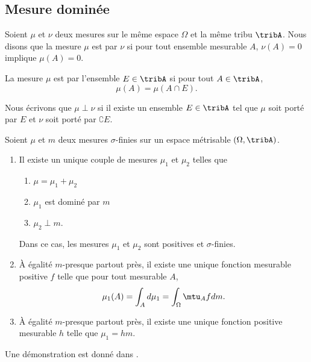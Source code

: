 \subsection{Mesure dominée}

Soient \( \mu\) et \( \nu\) deux mesures sur le même espace \( \Omega\) et la même tribu \( \tribA\). Nous disons que la mesure \( \mu\) est \cite{PersoFeng} par \( \nu\) si pour tout ensemble mesurable \( A\), \( \nu(A)=0\) implique \( \mu(A)=0\).

La mesure \( \mu\) est  par l'ensemble \( E\in\tribA\) si pour tout \( A\in\tribA\), 
\begin{equation}
    \mu(A)=\mu(A\cap E).
\end{equation}

Nous écrivons que \( \mu\perp\nu\) si il existe un ensemble \( E\in\tribA\) tel que \( \mu\) soit porté par \( E\) et \( \nu\) soit porté par \( \complement E\).

\begin{theorem}
    Soient \( \mu\) et \( m\) deux mesures \( \sigma\)-finies sur un espace métrisable \( (\Omega,\tribA)\).
    \begin{enumerate}
        \item
            Il existe un unique couple de mesures \( \mu_1\) et \( \mu_2\) telles que
            \begin{enumerate}
                \item
                    \( \mu=\mu_1+\mu_2\)
                \item
                    \( \mu_1\) est dominé par \( m\)
                \item
                    \( \mu_2\perp m\).
            \end{enumerate}
            Dans ce cas, les mesures \( \mu_1\) et \( \mu_2\) sont positives et \( \sigma\)-finies.
        \item
            À égalité \(  m\)-presque partout près, il existe une unique fonction mesurable positive \( f\) telle que pour tout mesurable \( A\),
            \begin{equation}
                \mu_1(A)=\int_Ad\mu_1=\int_{\Omega}\mtu_Afd m.
            \end{equation}
        \item
            À égalité \( m\)-presque partout près, il existe une unique fonction positive mesurable \( h\) telle que \( \mu_1=hm\).
    \end{enumerate}
\end{theorem}
Une démonstration est donné dans \cite{NikoLi}.


